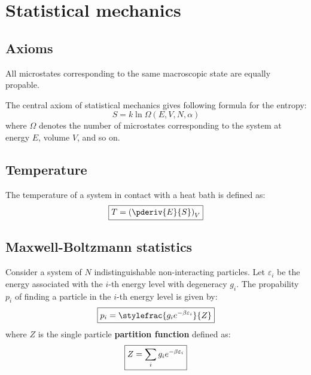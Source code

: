 \chapter{Statistical mechanics}

\section{Axioms}
    
    \begin{theorem}
    	All microstates corresponding to the same macroscopic state are equally propable.
    \end{theorem}
	\begin{theorem}
    	The central axiom of statistical mechanics gives following formula for the entropy:
		\begin{equation}
			\label{statmech:boltzmann_formula}
            \boxed{S = k\ln\Omega(E, V, N, \alpha)}
		\end{equation}
        where $\Omega$ denotes the number of microstates corresponding to the system at energy $E$, volume $V$, and so on.
	\end{theorem}
    
	\section{Temperature}
    	The temperature of a system in contact with a heat bath is defined as:
    	\begin{equation}
        	\label{statmech:temperature}
			\boxed{T = \left(\pderiv{E}{S}\right)_V}
		\end{equation}
    
\section{Maxwell-Boltzmann statistics}

    	Consider a system of $N$ indistinguishable non-interacting particles. Let $\varepsilon_i$ be the energy associated with the $i$-th energy level with degeneracy $g_i$. The propability $p_i$ of finding a particle in the $i$-th energy level is given by:
    	\begin{equation}
			\boxed{p_i = \stylefrac{g_i e^{-\beta\varepsilon_i}}{Z}}
		\end{equation}
        where $Z$ is the single particle \textbf{partition function} defined as:
        \begin{equation}\index{partition function}
			\label{statmech:partition_function}
            \boxed{Z = \sum_i{g_ie^{-\beta\varepsilon_i}}}
		\end{equation}
        
